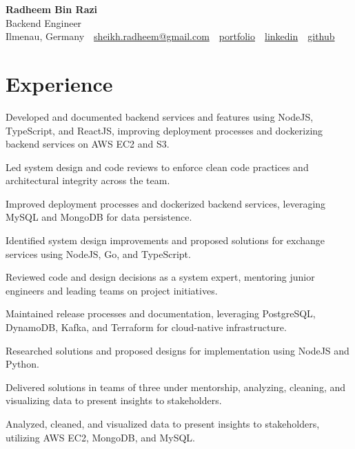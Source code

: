 \documentclass[11pt,a4paper]{resume}
\makeatletter
\newcommand{\Portfolio}{https://radheem.github.io/my-cv}
\newcommand{\PortfolioText}{portfolio}
\newcommand{\GitHub}{https://github.com/radheem}
\newcommand{\LinkedIn}{https://www.linkedin.com/in/radheem-razi}
\newcommand{\Email}{sheikh.radheem@gmail.com}
\makeatother
\begin{document}
\begin{center}
  {\huge\bfseries Radheem Bin Razi}\\[3pt]
  {\large Backend Engineer}\\[6pt]
  \small
  Ilmenau, Germany \,\textbar\,
  \href{mailto:\Email}{\Email} \,\textbar\,
  \href{\Portfolio}{\PortfolioText} \,\textbar\,
  \href{\LinkedIn}{linkedin} \,\textbar\,
  \href{\GitHub}{github}
\end{center}
\vspace{2pt}

\section{Experience}

\bullets
  \item Developed and documented backend services and features using NodeJS, TypeScript, and ReactJS, improving deployment processes and dockerizing backend services on AWS EC2 and S3.
  \item Led system design and code reviews to enforce clean code practices and architectural integrity across the team.
  \item Improved deployment processes and dockerized backend services, leveraging MySQL and MongoDB for data persistence.
\bulletsend
\vspace{3pt}
\bullets
  \item Identified system design improvements and proposed solutions for exchange services using NodeJS, Go, and TypeScript.
  \item Reviewed code and design decisions as a system expert, mentoring junior engineers and leading teams on project initiatives.
  \item Maintained release processes and documentation, leveraging PostgreSQL, DynamoDB, Kafka, and Terraform for cloud-native infrastructure.
\bulletsend
\vspace{3pt}
\bullets
  \item Researched solutions and proposed designs for implementation using NodeJS and Python.
  \item Delivered solutions in teams of three under mentorship, analyzing, cleaning, and visualizing data to present insights to stakeholders.
  \item Analyzed, cleaned, and visualized data to present insights to stakeholders, utilizing AWS EC2, MongoDB, and MySQL.
\bulletsend
\vspace{3pt}
\end{document}
